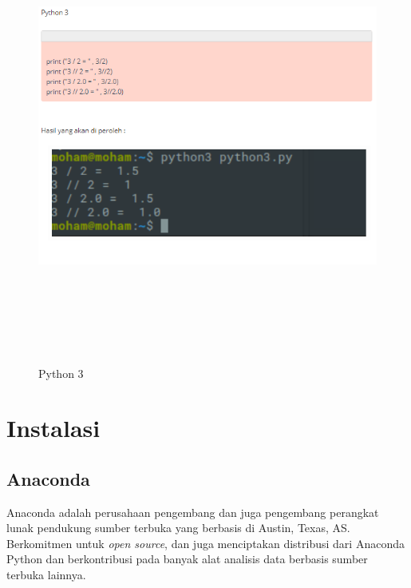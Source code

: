 \begin{enumerate}
\begin{figure}[!htbp]
\centering
\includegraphics[width=15cm,height=15cm]{figures/6.PNG}
\caption{Python 3}
\label{penanda}
\end{figure}

\end{enumerate}
\section{Instalasi}
\subsection{Anaconda}
\par 
		Anaconda adalah perusahaan pengembang dan juga pengembang perangkat lunak pendukung sumber terbuka yang berbasis di Austin, Texas, AS. Berkomitmen untuk \textit{open source}, dan juga menciptakan distribusi dari Anaconda Python dan berkontribusi pada banyak alat analisis data berbasis sumber terbuka lainnya.

